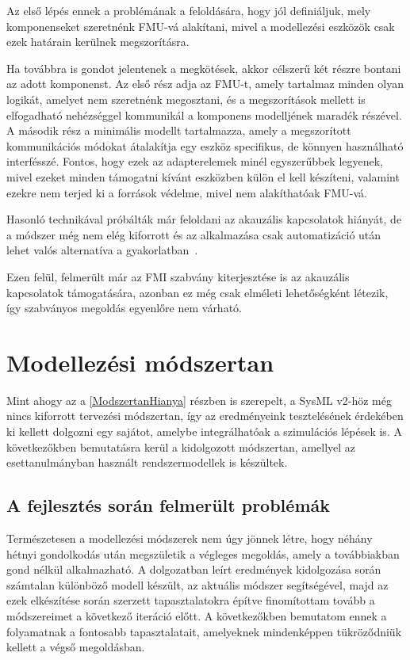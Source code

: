         Az első lépés ennek a problémának a feloldására, hogy jól definiáljuk, mely komponenseket szeretnénk FMU-vá alakítani, mivel a modellezési eszközök csak ezek határain kerülnek megszorításra.
        
        Ha továbbra is gondot jelentenek a megkötések, akkor célszerű két részre bontani az adott komponenst.
        Az első rész adja az FMU-t, amely tartalmaz minden olyan logikát, amelyet nem szeretnénk megosztani, és a megszorítások mellett is elfogadható nehézséggel kommunikál a komponens modelljének maradék részével.
        A második rész a minimális modellt tartalmazza, amely a megszorított kommunikációs módokat átalakítja egy eszköz specifikus, de könnyen használható interfésszé.
        Fontos, hogy ezek az adapterelemek minél egyszerűbbek legyenek, mivel ezeket minden támogatni kívánt eszközben külön el kell készíteni, valamint ezekre nem terjed ki a források védelme, mivel nem alakíthatóak FMU-vá.
        
        Hasonló technikával próbálták már feloldani az akauzális kapcsolatok hiányát, de a módszer még nem elég kiforrott és az alkalmazása csak automatizáció után lehet valós alternatíva a gyakorlatban~\cite{Hirano_2015, Fish2023}.
        
        Ezen felül, felmerült már az FMI szabvány kiterjesztése is az akauzális kapcsolatok támogatására, azonban ez még csak elméleti lehetőségként létezik, így szabványos megoldás egyenlőre nem várható.

\section{Modellezési módszertan}
Mint ahogy az a \ref{ModszertanHianya} részben is szerepelt, a SysML v2-höz még nincs kiforrott tervezési módszertan, így az eredményeink tesztelésének érdekében ki kellett dolgozni egy sajátot, amelybe integrálhatóak a szimulációs lépések is.
A következőkben bemutatásra kerül a kidolgozott módszertan, amellyel az esettanulmányban használt rendszermodellek is készültek.
    
    \subsection{A fejlesztés során felmerült problémák} \label{ProblemsToSolve}
    Természetesen a modellezési módszerek nem úgy jönnek létre, hogy néhány hétnyi gondolkodás után megszületik a végleges megoldás, amely a továbbiakban gond nélkül alkalmazható.
    A dolgozatban leírt eredmények kidolgozása során számtalan különböző modell készült, az aktuális módszer segítségével, majd az ezek elkészítése során szerzett tapasztalatokra építve finomítottam tovább a módszereimet a következő iteráció előtt.
    A következőkben bemutatom ennek a folyamatnak a fontosabb tapasztalatait, amelyeknek mindenképpen tükröződniük kellett a végső megoldásban.

